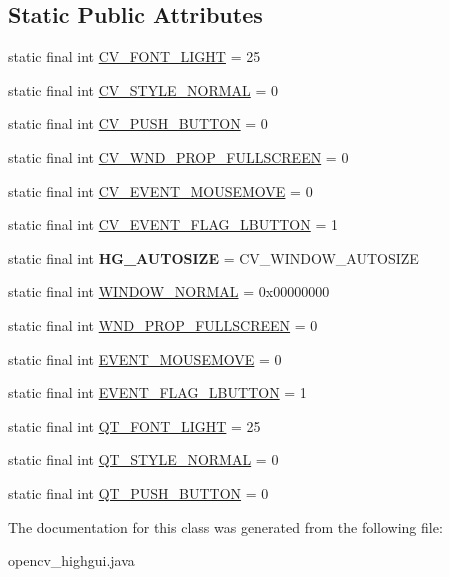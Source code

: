 \subsection*{Static Public Attributes}
\begin{DoxyCompactItemize}
\item 
static final int \hyperlink{group__highgui__c_ga997b89fc958011c83e9b4cc4d4ad4325}{C\+V\+\_\+\+F\+O\+N\+T\+\_\+\+L\+I\+G\+HT} = 25
\item 
static final int \hyperlink{group__highgui__c_ga56cd33d4cb9f9b515efedaead4248259}{C\+V\+\_\+\+S\+T\+Y\+L\+E\+\_\+\+N\+O\+R\+M\+AL} = 0
\item 
static final int \hyperlink{group__highgui__c_ga4a134d3b4944f55e83c58bc64ad00a74}{C\+V\+\_\+\+P\+U\+S\+H\+\_\+\+B\+U\+T\+T\+ON} = 0
\item 
static final int \hyperlink{group__highgui__c_ga831b812c11a02daadd9eb33d3254e2a1}{C\+V\+\_\+\+W\+N\+D\+\_\+\+P\+R\+O\+P\+\_\+\+F\+U\+L\+L\+S\+C\+R\+E\+EN} = 0
\item 
static final int \hyperlink{group__highgui__c_gaacb100056c747de1e17b2c216dc0c495}{C\+V\+\_\+\+E\+V\+E\+N\+T\+\_\+\+M\+O\+U\+S\+E\+M\+O\+VE} = 0
\item 
static final int \hyperlink{group__highgui__c_ga1d9ec028c68ce5bc18849288ec24ae36}{C\+V\+\_\+\+E\+V\+E\+N\+T\+\_\+\+F\+L\+A\+G\+\_\+\+L\+B\+U\+T\+T\+ON} = 1
\item 
static final int {\bfseries H\+G\+\_\+\+A\+U\+T\+O\+S\+I\+ZE} = C\+V\+\_\+\+W\+I\+N\+D\+O\+W\+\_\+\+A\+U\+T\+O\+S\+I\+ZE
\item 
static final int \hyperlink{group__highgui_ga2afebfdebe6ea3696f89b4a7628e72e3}{W\+I\+N\+D\+O\+W\+\_\+\+N\+O\+R\+M\+AL} = 0x00000000
\item 
static final int \hyperlink{group__highgui_ga600b654f3be9263c511b1588f7ea735d}{W\+N\+D\+\_\+\+P\+R\+O\+P\+\_\+\+F\+U\+L\+L\+S\+C\+R\+E\+EN} = 0
\item 
static final int \hyperlink{group__highgui_ga6d55d280d31ae69d883e955f615fda29}{E\+V\+E\+N\+T\+\_\+\+M\+O\+U\+S\+E\+M\+O\+VE} = 0
\item 
static final int \hyperlink{group__highgui_gac433101d8b17471ae4cc5161be63c257}{E\+V\+E\+N\+T\+\_\+\+F\+L\+A\+G\+\_\+\+L\+B\+U\+T\+T\+ON} = 1
\item 
static final int \hyperlink{group__highgui_gae35aa28b68ea30b61b8b4b740ceca6e3}{Q\+T\+\_\+\+F\+O\+N\+T\+\_\+\+L\+I\+G\+HT} = 25
\item 
static final int \hyperlink{group__highgui_ga7818f5f33d8fac97fbdba68143ec8bb7}{Q\+T\+\_\+\+S\+T\+Y\+L\+E\+\_\+\+N\+O\+R\+M\+AL} = 0
\item 
static final int \hyperlink{group__highgui_gaae4d93a303a93e9c2ecece3adad55dc4}{Q\+T\+\_\+\+P\+U\+S\+H\+\_\+\+B\+U\+T\+T\+ON} = 0
\end{DoxyCompactItemize}


The documentation for this class was generated from the following file\+:\begin{DoxyCompactItemize}
\item 
opencv\+\_\+highgui.\+java\end{DoxyCompactItemize}

